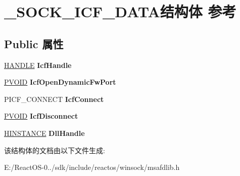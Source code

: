 \hypertarget{struct___s_o_c_k___i_c_f___d_a_t_a}{}\section{\+\_\+\+S\+O\+C\+K\+\_\+\+I\+C\+F\+\_\+\+D\+A\+T\+A结构体 参考}
\label{struct___s_o_c_k___i_c_f___d_a_t_a}
\subsection*{Public 属性}
\begin{DoxyCompactItemize}
\item 
\mbox{\label{struct___s_o_c_k___i_c_f___d_a_t_a_ad3cf5d7fc848737f6daabb67efbbd8a3}} 
\hyperlink{interfacevoid}{H\+A\+N\+D\+LE} {\bfseries Icf\+Handle}
\item 
\mbox{\label{struct___s_o_c_k___i_c_f___d_a_t_a_acaf7f625c3957f0c5f473d47d5df2cf2}} 
\hyperlink{interfacevoid}{P\+V\+O\+ID} {\bfseries Icf\+Open\+Dynamic\+Fw\+Port}
\item 
\mbox{\label{struct___s_o_c_k___i_c_f___d_a_t_a_af08099921293e268086cd089f8d7845f}} 
P\+I\+C\+F\+\_\+\+C\+O\+N\+N\+E\+CT {\bfseries Icf\+Connect}
\item 
\mbox{\label{struct___s_o_c_k___i_c_f___d_a_t_a_aff858f31e5c588f850ed47d2fe25ebbf}} 
\hyperlink{interfacevoid}{P\+V\+O\+ID} {\bfseries Icf\+Disconnect}
\item 
\mbox{\label{struct___s_o_c_k___i_c_f___d_a_t_a_a4c58d63b7c4832655908aa38c3f514fe}} 
\hyperlink{interfacevoid}{H\+I\+N\+S\+T\+A\+N\+CE} {\bfseries Dll\+Handle}
\end{DoxyCompactItemize}


该结构体的文档由以下文件生成\+:\begin{DoxyCompactItemize}
\item 
E\+:/\+React\+O\+S-\/0../sdk/include/reactos/winsock/msafdlib.\+h\end{DoxyCompactItemize}
